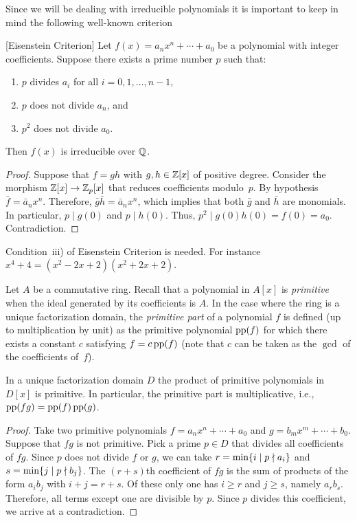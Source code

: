 Since we will be dealing with irreducible polynomials it is important to keep in mind the following well-known criterion

\begin{lem}\label{lem:eisenstein}{\rm[Eisenstein Criterion]}
    Let\/ $f(x) = a_n x^n + \cdots + a_0$ be a polynomial with integer coefficients. Suppose there exists a prime number\/ $p$ such that:
    \begin{enumerate}[\rm i)]
        \item $p$ divides\/ $a_i$ for all\/ $i = 0,1,\dots,n-1$,
        \item $p$ does not divide\/ $a_n$, and
        \item $p^2$ does not divide\/ $a_0$.
    \end{enumerate}
    Then\/ $f(x)$ is irreducible over\/ $\mathbb{Q}$.
\end{lem}

\begin{proof}
    Suppose that $f=gh$ with $g,h\in\mathbb{Z}[x]$ of positive degree. Consider the morphism $\mathbb{Z}[x]\to\mathbb{Z}_p[x]$ that reduces coefficients modulo~$p$. By hypothesis $\bar f=\bar a_nx^n$. Therefore, $\bar g\bar h=\bar a_nx^n$, which implies that both $\bar g$ and $\bar h$ are monomials. In particular, $p\mid g(0)$ and $p\mid h(0)$. Thus, $p^2\mid g(0)h(0)=f(0)=a_0$. Contradiction.
\end{proof}

\begin{rem}
    Condition~iii) of Eisenstein Criterion is needed. For instance $x^4+4=(x^2-2x+2)(x^2+2x+2)$.
\end{rem}

Let $A$ be a commutative ring. Recall that a polynomial in $A[x]$ is \textsl{primitive\/} when the ideal generated by its coefficients is $A$. In the case where the ring is a unique factorization domain, the \textsl{primitive part\/} of a polynomial $f$ is defined (up to multiplication by unit) as the primitive polynomial $\operatorname{pp}(f)$ for which there exists a constant $c$ satisfying $f=c\operatorname{pp}(f)$ (note that $c$ can be taken as the $\gcd$ of the coefficients of~$f$).

\begin{lem}\label{lem:pp-is-multiplicative}
    In a unique factorization domain $D$ the product of primitive polynomials in $D[x]$ is primitive. In particular, the primitive part is multiplicative, i.e., $\operatorname{pp}(fg)=\operatorname{pp}(f)\operatorname{pp}(g)$.
\end{lem}

\begin{proof}
    Take two primitive polynomials $f=a_nx^n+\cdots+a_0$ and $g=b_mx^m+\cdots+b_0$. Suppose that $fg$ is not primitive. Pick a prime $p\in D$ that divides all coefficients of $fg$. Since $p$ does not divide $f$ or $g$, we can take $r=\min\{i\mid p\nmid a_i\}$ and $s=\min\{j\mid p\nmid b_j\}$. The $(r+s)$th coefficient of $fg$ is the sum of products of the form $a_ib_j$ with $i+j=r+s$. Of these only one has $i\ge r$ and $j\ge s$, namely $a_rb_s$. Therefore, all terms except one are divisible by $p$. Since $p$ divides this coefficient, we arrive at a contradiction.
\end{proof}

